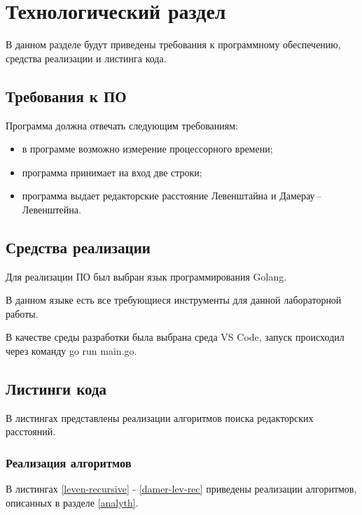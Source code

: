 \chapter{Технологический раздел}

В данном разделе будут приведены требования к программному обеспечению, средства реализации и листинга кода.

\section{Требования к ПО}
Программа должна отвечать следующим требованиям:
\begin{itemize}
	\item в программе возможно измерение процессорного времени;
	\item программа принимает на вход две строки;
	\item программа выдает редакторские расстояние Левенштайна и Дамерау\,--\,Левенштейна. 
\end{itemize}
\section{Средства реализации}
Для реализации ПО был выбран язык программирования Golang\cite{golang}. 

В данном языке есть все требующиеся инструменты для данной лабораторной работы.

В качестве среды разработки была выбрана среда VS Code\cite{rune}, запуск происходил через команду go run main.go.

\section{Листинги кода}

В листингах представлены реализации алгоритмов поиска редакторских расстояний.

\subsection{Реализация алгоритмов}



В листингах \ref{leven-recursive} - \ref{damer-lev-rec} приведены реализации алгоритмов, описанных в разделе \ref{analyth}.


